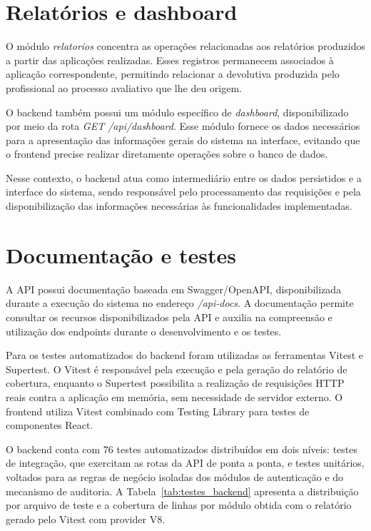 \section{Relatórios e dashboard}

O módulo \textit{relatorios} concentra as operações relacionadas aos relatórios produzidos a partir das aplicações realizadas. Esses registros permanecem associados à aplicação correspondente, permitindo relacionar a devolutiva produzida pelo profissional ao processo avaliativo que lhe deu origem.

O backend também possui um módulo específico de \textit{dashboard}, disponibilizado por meio da rota \textit{GET /api/dashboard}. Esse módulo fornece os dados necessários para a apresentação das informações gerais do sistema na interface, evitando que o frontend precise realizar diretamente operações sobre o banco de dados.

Nesse contexto, o backend atua como intermediário entre os dados persistidos e a interface do sistema, sendo responsável pelo processamento das requisições e pela disponibilização das informações necessárias às funcionalidades implementadas.

\section{Documentação e testes}

A API possui documentação baseada em Swagger/OpenAPI, disponibilizada durante a execução do sistema no endereço \textit{/api-docs}. A documentação permite consultar os recursos disponibilizados pela API e auxilia na compreensão e utilização dos endpoints durante o desenvolvimento e os testes.

Para os testes automatizados do backend foram utilizadas as ferramentas Vitest e Supertest. O Vitest é responsável pela execução e pela geração do relatório de cobertura, enquanto o Supertest possibilita a realização de requisições HTTP reais contra a aplicação em memória, sem necessidade de servidor externo. O frontend utiliza Vitest combinado com Testing Library para testes de componentes React.

O backend conta com 76 testes automatizados distribuídos em dois níveis: testes de integração, que exercitam as rotas da API de ponta a ponta, e testes unitários, voltados para as regras de negócio isoladas dos módulos de autenticação e do mecanismo de auditoria. A Tabela~\ref{tab:testes_backend} apresenta a distribuição por arquivo de teste e a cobertura de linhas por módulo obtida com o relatório gerado pelo Vitest com provider V8.

